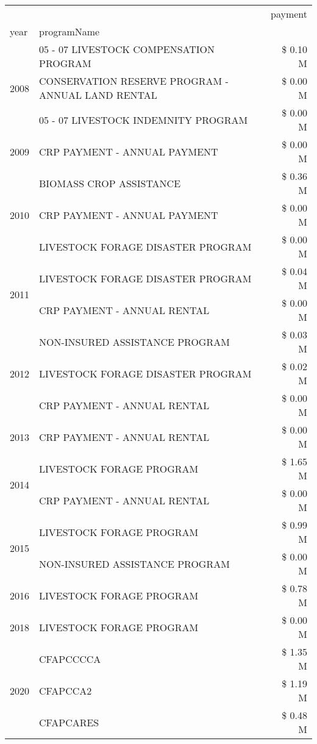 \begin{tabular}{llr}
\toprule
 &  & payment \\
year & programName &  \\
\midrule
\multirow[t]{3}{*}{2008} & 05 - 07 LIVESTOCK COMPENSATION PROGRAM & \$ 0.10 M \\
 & CONSERVATION RESERVE PROGRAM - ANNUAL LAND RENTAL & \$ 0.00 M \\
 & 05 - 07 LIVESTOCK INDEMNITY PROGRAM & \$ 0.00 M \\
\cline{1-3}
2009 & CRP PAYMENT - ANNUAL PAYMENT & \$ 0.00 M \\
\cline{1-3}
\multirow[t]{3}{*}{2010} & BIOMASS CROP ASSISTANCE & \$ 0.36 M \\
 & CRP PAYMENT - ANNUAL PAYMENT & \$ 0.00 M \\
 & LIVESTOCK FORAGE DISASTER  PROGRAM & \$ 0.00 M \\
\cline{1-3}
\multirow[t]{2}{*}{2011} & LIVESTOCK FORAGE DISASTER PROGRAM & \$ 0.04 M \\
 & CRP PAYMENT - ANNUAL RENTAL & \$ 0.00 M \\
\cline{1-3}
\multirow[t]{3}{*}{2012} & NON-INSURED ASSISTANCE PROGRAM & \$ 0.03 M \\
 & LIVESTOCK FORAGE DISASTER PROGRAM & \$ 0.02 M \\
 & CRP PAYMENT - ANNUAL RENTAL & \$ 0.00 M \\
\cline{1-3}
2013 & CRP PAYMENT - ANNUAL RENTAL & \$ 0.00 M \\
\cline{1-3}
\multirow[t]{2}{*}{2014} & LIVESTOCK FORAGE PROGRAM & \$ 1.65 M \\
 & CRP PAYMENT - ANNUAL RENTAL & \$ 0.00 M \\
\cline{1-3}
\multirow[t]{2}{*}{2015} & LIVESTOCK FORAGE PROGRAM & \$ 0.99 M \\
 & NON-INSURED ASSISTANCE PROGRAM & \$ 0.00 M \\
\cline{1-3}
2016 & LIVESTOCK FORAGE PROGRAM & \$ 0.78 M \\
\cline{1-3}
2018 & LIVESTOCK FORAGE PROGRAM & \$ 0.00 M \\
\cline{1-3}
\multirow[t]{3}{*}{2020} & CFAPCCCCA & \$ 1.35 M \\
 & CFAPCCA2 & \$ 1.19 M \\
 & CFAPCARES & \$ 0.48 M \\
\cline{1-3}
\bottomrule
\end{tabular}
